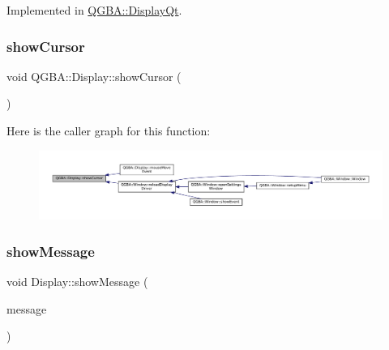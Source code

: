 Implemented in \mbox{\hyperlink{class_q_g_b_a_1_1_display_qt_a9a92bfeed37ab4ebf5dcad5f573cd9e9}{Q\+G\+B\+A\+::\+Display\+Qt}}.

\mbox{\label{class_q_g_b_a_1_1_display_ad8e1af9c931a15f25f888bf0fe9c87c9}} 
\subsubsection{\texorpdfstring{show\+Cursor}{showCursor}}
{\footnotesize\ttfamily void Q\+G\+B\+A\+::\+Display\+::show\+Cursor (\begin{DoxyParamCaption}{ }\end{DoxyParamCaption})\hspace{0.3cm}{\ttfamily [signal]}}

Here is the caller graph for this function\+:
\nopagebreak
\begin{figure}[H]
\begin{center}
\leavevmode
\includegraphics[width=350pt]{class_q_g_b_a_1_1_display_ad8e1af9c931a15f25f888bf0fe9c87c9_icgraph}
\end{center}
\end{figure}
\mbox{\label{class_q_g_b_a_1_1_display_ab4e04e33416aafdc2a3455babf6bfdb4}} 
\subsubsection{\texorpdfstring{show\+Message}{showMessage}}
{\footnotesize\ttfamily void Display\+::show\+Message (\begin{DoxyParamCaption}\item[{const Q\+String \&}]{message }\end{DoxyParamCaption})\hspace{0.3cm}{\ttfamily [slot]}}

